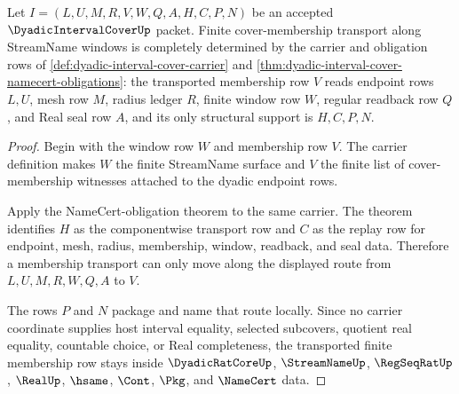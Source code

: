 \begin{theorem}
\label{thm:dyadic-interval-cover-window-membership-transport}
Let $I=(L,U,M,R,V,W,Q,A,H,C,P,N)$ be an accepted $\DyadicIntervalCoverUp$ packet. Finite cover-membership transport along StreamName windows is completely determined by the carrier and obligation rows of \autoref{def:dyadic-interval-cover-carrier} and \autoref{thm:dyadic-interval-cover-namecert-obligations}: the transported membership row $V$ reads endpoint rows $L,U$, mesh row $M$, radius ledger $R$, finite window row $W$, regular readback row $Q$, and Real seal row $A$, and its only structural support is $H,C,P,N$.
\end{theorem}
\begin{proof}
Begin with the window row $W$ and membership row $V$. The carrier definition makes $W$ the finite StreamName surface and $V$ the finite list of cover-membership witnesses attached to the dyadic endpoint rows.

Apply the NameCert-obligation theorem to the same carrier. The theorem identifies $H$ as the componentwise transport row and $C$ as the replay row for endpoint, mesh, radius, membership, window, readback, and seal data. Therefore a membership transport can only move along the displayed route from $L,U,M,R,W,Q,A$ to $V$.

The rows $P$ and $N$ package and name that route locally. Since no carrier coordinate supplies host interval equality, selected subcovers, quotient real equality, countable choice, or Real completeness, the transported finite membership row stays inside $\DyadicRatCoreUp$, $\StreamNameUp$, $\RegSeqRatUp$, $\RealUp$, $\hsame$, $\Cont$, $\Pkg$, and $\NameCert$ data.
\end{proof}

